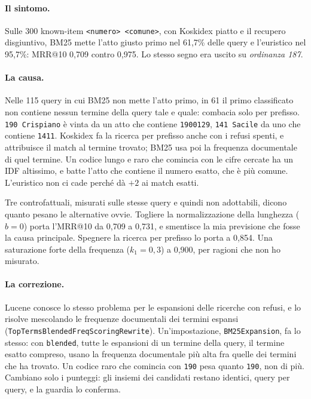 \paragraph{Il sintomo.} Sulle 300 known-item \texttt{<numero> <comune>}, con
Koskidex piatto e il recupero disgiuntivo, BM25 mette l'atto giusto primo nel
61,7\% delle query e l'euristico nel 95,7\%: MRR@10 0,709 contro 0,975. Lo stesso
segno era uscito su \emph{ordinanza 187}.

\paragraph{La causa.} Nelle 115 query in cui BM25 non mette l'atto primo, in 61
il primo classificato non contiene nessun termine della query tale e quale:
combacia solo per prefisso. \texttt{190 Crispiano} è vinta da un atto che contiene
\texttt{1900129}, \texttt{141 Sacile} da uno che contiene \texttt{1411}.
Koskidex fa la ricerca per prefisso anche con i refusi spenti, e attribuisce il
match al termine trovato; BM25 usa poi la frequenza documentale di quel termine.
Un codice lungo e raro che comincia con le cifre cercate ha un IDF altissimo, e
batte l'atto che contiene il numero esatto, che è più comune. L'euristico non ci
cade perché dà $+2$ ai match esatti.

Tre controfattuali, misurati sulle stesse query e quindi non adottabili, dicono
quanto pesano le alternative ovvie. Togliere la normalizzazione della lunghezza
($b = 0$) porta l'MRR@10 da 0,709 a 0,731, e smentisce la mia previsione che
fosse la causa principale. Spegnere la ricerca per prefisso lo porta a 0,854. Una
saturazione forte della frequenza ($k_1 = 0{,}3$) a 0,900, per ragioni che non ho
misurato.

\paragraph{La correzione.} Lucene conosce lo stesso problema per le espansioni
delle ricerche con refusi, e lo risolve mescolando le frequenze documentali dei
termini espansi (\texttt{TopTermsBlendedFreqScoringRewrite}). Un'impostazione,
\texttt{BM25Expansion}, fa lo stesso: con \texttt{blended}, tutte le espansioni
di un termine della query, il termine esatto compreso, usano la frequenza
documentale più alta fra quelle dei termini che ha trovato. Un codice raro che
comincia con \texttt{190} pesa quanto \texttt{190}, non di più. Cambiano solo i
punteggi: gli insiemi dei candidati restano identici, query per query, e la
guardia lo conferma.

